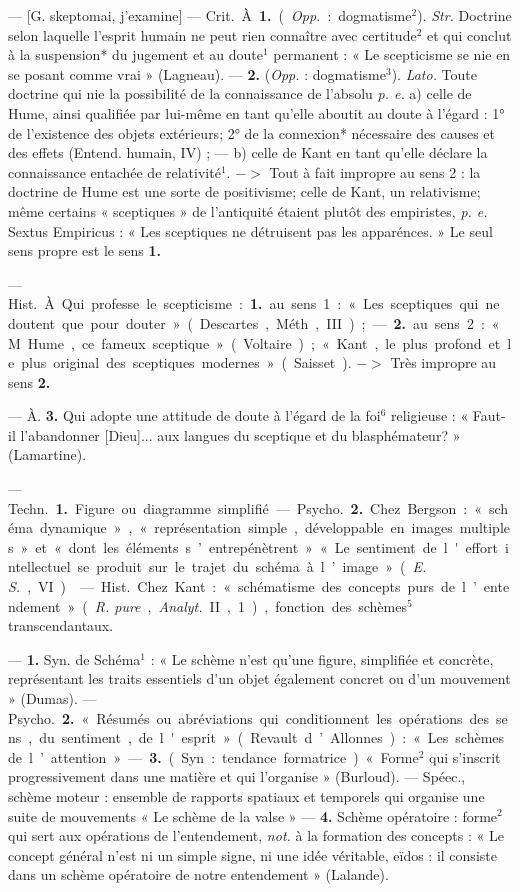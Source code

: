 \begin{itemize}[leftmargin=1cm, label=, itemsep=1pt]
 — [G. skeptomai, j'examine]
— \si{Crit.} À. {\bf 1.} ({\it Opp.} : dogmatisme$^2$).
{\it Str.} Doctrine selon laquelle l'esprit
humain ne peut rien connaître avec
certitude$^2$ et qui conclut à la suspension* du jugement et au doute$^1$
permanent : « Le scepticisme se nie
en se posant comme vrai » (Lagneau).
— {\bf 2.} ({\it Opp.} : dogmatisme$^3$). {\it Lato.}
Toute doctrine qui nie la possibilité
de la connaissance de l'absolu
{\it p. e.} a) celle de Hume, ainsi qualifiée
par lui-même en tant qu’elle aboutit
au doute à l'égard : 1° de l’existence
des objets extérieurs; 2° de la connexion* nécessaire des causes et des
effets (Entend. humain, IV) ; —
b) celle de Kant en tant qu’elle
déclare la connaissance entachée de
relativité$^1$. $->$ Tout à fait impropre
au sens 2 : la doctrine de Hume est
une sorte de positivisme; celle de
Kant, un relativisme; même certains « sceptiques » de l'antiquité
étaient plutôt des empiristes, {\it p. e.}
Sextus Empiricus : « Les sceptiques
ne détruisent pas les apparénces. »
Le seul sens propre est le sens {\bf 1.}

 — \si{Hist.} À. Qui professe
le scepticisme : {\bf 1.} au sens 1 : « Les
sceptiques qui ne doutent que pour
douter » (Descartes, Méth., III) ; —
 {\bf 2.} au sens 2 : « M. Hume, ce fameux
sceptique... » (Voltaire) ; « Kant, le
plus profond et le plus original des
sceptiques modernes... » (Saisset).
$->$ Très impropre au sens {\bf 2.}

— À. {\bf 3.} Qui adopte une attitude
de doute à l’égard de la foi$^6$ religieuse : « Faut-il l’abandonner
[Dieu]... aux langues du sceptique
et du blasphémateur? » (Lamartine).

 — \si{Techn.} {\bf 1.} Figure ou diagramme simplifié. — \si{Psycho.} {\bf 2.} Chez
Bergson : « schéma dynamique »,
« représentation simple, développable en images multiples » et « dont
les éléments s’entrepénètrent »
« Le sentiment de l'effort intellectuel se produit sur le trajet du
schéma à l’image » ({\it E. S.}, VI).

 — \si{Hist.} Chez Kant :
« schématisme des concepts purs de
l’entendement » ({\it R. pure}, {\it Analyt.}
II, 1), fonction des schèmes$^5$ transcendantaux.

 — {\bf 1.} Syn. de Schéma$^1$ : « Le
schème n’est qu’une figure, simplifiée et concrète, représentant les
traits essentiels d’un objet également concret ou d’un mouvement »
(Dumas). — \si{Psycho.} {\bf 2.} « Résumés
ou abréviations qui conditionnent
les opérations des sens, du sentiment, de l'esprit » (Revault d’Allonnes) : « Les schèmes de l’attention ». — {\bf 3.} (Syn. : tendance formatrice). « Forme$^2$ qui s’inscrit progressivement dans une matière et qui
l’organise » (Burloud). — Spéec.,
schème moteur : ensemble de rapports spatiaux et temporels qui organise une suite de mouvements
« Le schème de la valse » — {\bf 4.}
Schème opératoire : forme$^2$ qui sert
aux opérations de l’entendement,
{\it not.} à la formation des concepts :
« Le concept général n’est ni un
simple signe, ni une idée véritable,
eïdos : il consiste dans un schème
opératoire de notre entendement »
(Lalande).


\end{itemize}
